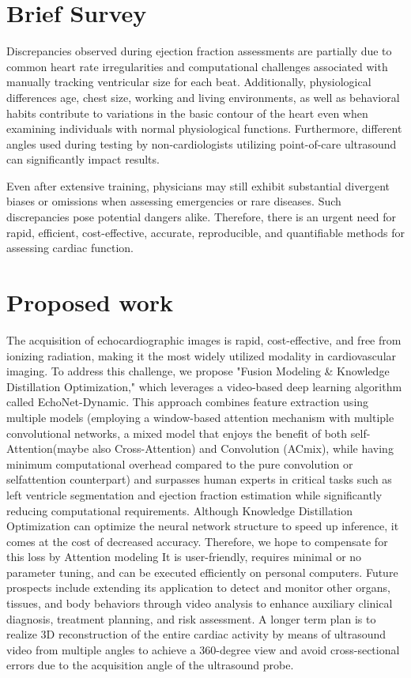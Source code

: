 \section{Brief Survey}
\label{sec:intro}

Discrepancies observed during ejection fraction assessments are partially due to common heart rate irregularities and computational challenges associated with manually tracking ventricular size for each beat. Additionally, physiological differences age, chest size, working and living environments, as well as behavioral habits contribute to variations in the basic contour of the heart even when examining individuals with normal physiological functions. Furthermore, different angles used during testing by non-cardiologists utilizing point-of-care ultrasound can significantly impact results.

Even after extensive training, physicians may still exhibit substantial divergent biases or omissions when assessing emergencies or rare diseases. Such discrepancies pose potential dangers alike. Therefore, there is an urgent need for rapid, efficient, cost-effective, accurate, reproducible, and quantifiable methods for assessing cardiac function.

\section{Proposed work}
The acquisition of echocardiographic images is rapid, cost-effective, and free from ionizing radiation, making it the most widely utilized modality in cardiovascular imaging. To address this challenge, we propose "Fusion Modeling  \& Knowledge Distillation Optimization," which leverages a video-based deep learning algorithm called EchoNet-Dynamic. This approach combines feature extraction using multiple models (employing a window-based attention mechanism with multiple convolutional networks, a mixed model that enjoys the benefit of both self-Attention(maybe also Cross-Attention) and Convolution (ACmix), while having minimum computational overhead compared to the pure convolution or selfattention counterpart) and surpasses human experts in critical tasks such as left ventricle segmentation and ejection fraction estimation while significantly reducing computational requirements. Although Knowledge Distillation Optimization can optimize the neural network structure to speed up inference, it comes at the cost of decreased accuracy. Therefore, we hope to compensate for this loss by Attention modeling It is user-friendly, requires minimal or no parameter tuning, and can be executed efficiently on personal computers. Future prospects include extending its application to detect and monitor other organs, tissues, and body behaviors through video analysis to enhance auxiliary clinical diagnosis, treatment planning, and risk assessment. A longer term plan is to realize 3D reconstruction of the entire cardiac activity by means of ultrasound video from multiple angles to achieve a 360-degree view and avoid cross-sectional errors due to the acquisition angle of the ultrasound probe.
